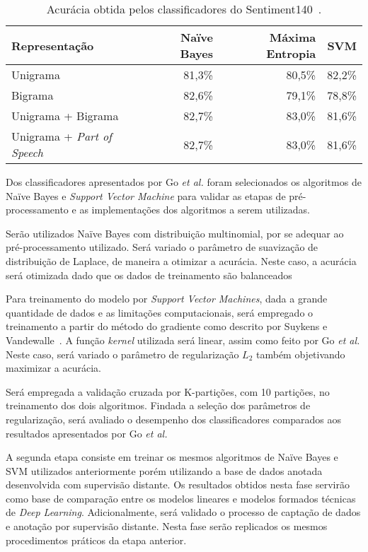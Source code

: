 \begin{table}[h]
    \begin{center}
        \begin{tabular}{| l | r | r | r |}
        \hline
        \textbf{Representação} & \textbf{Naïve Bayes} & \textbf{Máxima Entropia} & \textbf{SVM} \\ \hline
        Unigrama & 81,3\% & 80,5\% & 82,2\% \\ \hline
        Bigrama &  82,6\% & 79,1\% & 78,8\% \\ \hline
        Unigrama + Bigrama & 82,7\% & 83,0\% & 81,6\% \\ \hline
        Unigrama + \textit{Part of Speech} & 82,7\% & 83,0\% & 81,6\% \\ \hline
        \end{tabular}
        \caption{Acurácia obtida pelos classificadores do Sentiment140~\cite{go09}.}
        \label{tab:go}
    \end{center}
\end{table}

Dos classificadores apresentados por Go \textit{et al.} foram selecionados os algoritmos de Naïve Bayes e
\textit{Support Vector Machine} para validar as etapas de pré-processamento e as implementações dos algoritmos
a serem utilizadas.

Serão utilizados Naïve Bayes com distribuição multinomial, por se adequar ao pré-processamento utilizado.
Será variado o parâmetro de suavização de distribuição de Laplace, de maneira a otimizar a acurácia.
Neste caso, a acurácia será otimizada dado que os dados de treinamento são balanceados

Para treinamento do modelo por \textit{Support Vector Machines}, dada a grande quantidade de dados e as limitações
computacionais, será empregado o treinamento a partir do método do gradiente como descrito por Suykens e
Vandewalle~\cite{suykens99}.
A função \textit{kernel} utilizada será linear, assim como feito por Go \textit{et al.}
Neste caso, será variado o parâmetro de regularização $L_{2}$ também objetivando maximizar a acurácia.

Será empregada a validação cruzada por K-partições, com 10 partições, no treinamento dos dois algoritmos.
Findada a seleção dos parâmetros de regularização, será avaliado o desempenho dos classificadores comparados aos resultados
apresentados por Go \textit{et al.}

A segunda etapa consiste em treinar os mesmos algoritmos de Naïve Bayes e SVM utilizados anteriormente porém utilizando
a base de dados anotada desenvolvida com supervisão distante.
Os resultados obtidos nesta fase servirão como base de comparação entre os modelos lineares e modelos formados técnicas
de \textit{Deep Learning}.
Adicionalmente, será validado o processo de captação de dados e anotação por supervisão distante.
Nesta fase serão replicados os mesmos procedimentos práticos da etapa anterior.

